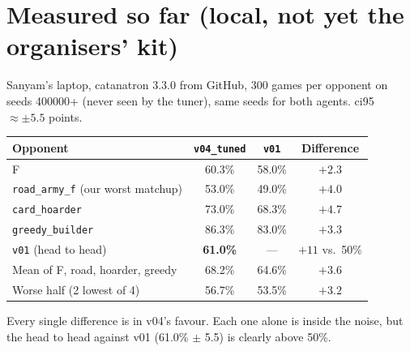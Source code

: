 \documentclass[11pt]{article}
\begin{document}
\section{Measured so far (local, not yet the organisers' kit)}
Sanyam's laptop, catanatron 3.3.0 from GitHub, 300 games per opponent on seeds 400000+ (never seen
by the tuner), same seeds for both agents. ci95 $\approx \pm5.5$ points.
\begin{center}
\begin{tabular}{lccc}
\toprule
Opponent & \texttt{v04\_tuned} & \texttt{v01} & Difference \\
\midrule
F & 60.3\% & 58.0\% & $+2.3$ \\
\texttt{road\_army\_f} (our worst matchup) & 53.0\% & 49.0\% & $+4.0$ \\
\texttt{card\_hoarder} & 73.0\% & 68.3\% & $+4.7$ \\
\texttt{greedy\_builder} & 86.3\% & 83.0\% & $+3.3$ \\
\texttt{v01} (head to head) & \textbf{61.0\%} & --- & $+11$ vs.\ 50\% \\
\midrule
Mean of F, road, hoarder, greedy & 68.2\% & 64.6\% & $+3.6$ \\
Worse half (2 lowest of 4) & 56.7\% & 53.5\% & $+3.2$ \\
\bottomrule
\end{tabular}
\end{center}
Every single difference is in v04's favour. Each one alone is inside the noise, but the head to
head against v01 (61.0\% $\pm$ 5.5) is clearly above 50\%.
\end{document}
